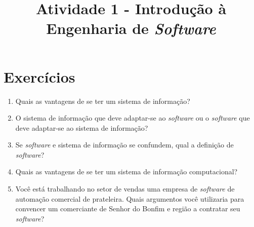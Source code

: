 \documentclass[12pt,a4paper]{article}
\title{Atividade 1 - Introdução à Engenharia de \textit{Software}}
\author{}
\date{}
\begin{document}
   \maketitle
   \section*{Exercícios}
      \begin{enumerate}
         \item Quais as vantagens de se ter um sistema de informação?
         \item O sistema de informação que deve adaptar-se ao \textit{software} ou o \textit{software} que deve adaptar-se ao sistema de informação?
         \item Se \textit{software} e sistema de informação se confundem, qual a definição de \textit{software}?
         \item Quais as vantagens de se ter um sistema de informação computacional?
         \item Você está trabalhando no setor de vendas uma empresa de \textit{software} de automação comercial de prateleira. Quais argumentos você utilizaria para convencer um comerciante de Senhor do Bonfim e região a contratar seu \textit{software}?
      \end{enumerate}
      
\end{document}
